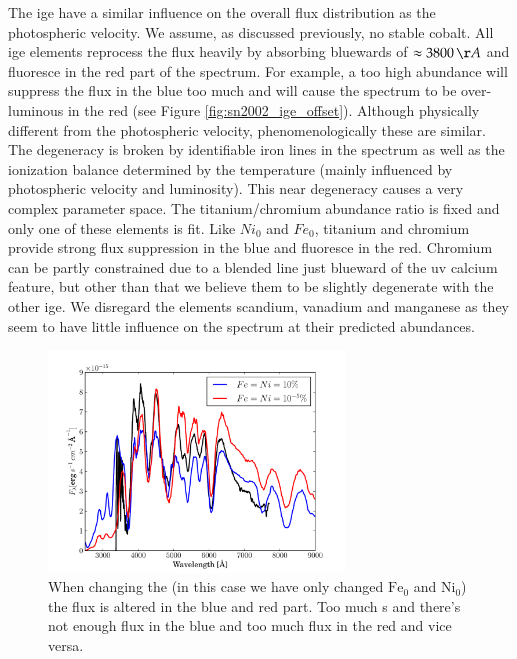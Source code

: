 The \gls{ige} have a similar influence on the overall flux distribution as the photospheric velocity. 
We assume, as discussed previously, no stable cobalt. All \gls{ige} elements reprocess the flux heavily by absorbing bluewards of $\approx 3800\,\AA$ and fluoresce in the red part of the spectrum. For example, a too high abundance will suppress the flux in the blue too much and will cause the spectrum to be over-luminous in the red (see Figure \ref{fig:sn2002_ige_offset}). Although physically different from the photospheric velocity, phenomenologically these are similar. The degeneracy is broken by identifiable iron lines in the spectrum as well as the ionization balance determined by the temperature (mainly influenced by photospheric velocity and luminosity). This near degeneracy causes a very complex parameter space. The titanium/chromium abundance ratio is fixed and only one of these elements is fit. Like $Ni_0$ and $Fe_0$, titanium and chromium provide strong flux suppression in the blue and fluoresce in the red. Chromium can be partly constrained due to a blended line just blueward of the \gls{uv} calcium feature, but other than that we believe them to be slightly degenerate with the other \gls{ige}. We disregard the elements scandium, vanadium and  manganese as they seem to have little influence on the spectrum at their predicted abundances.

\begin{figure}[tb] %
   \centering
   \includegraphics[width=0.7\textwidth]{chapter_dalek/plots/bf2002bo-10_ige.pdf} 
   \caption{When changing the  (in this case we have only changed $\textrm{Fe}_0$ and $\textrm{Ni}_0$) the flux is altered in the blue and red part. Too much s and there's not enough flux in the blue and too much flux in the red and vice versa.}
   \label{fig:sn2002bo_ige_offset}
\end{figure}

